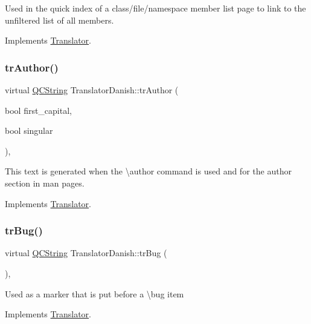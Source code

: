 Used in the quick index of a class/file/namespace member list page to link to the unfiltered list of all members. 

Implements \mbox{\hyperlink{class_translator}{Translator}}.

\mbox{\label{class_translator_danish_a0043467eabe0fc797268e9404c17d26b}} 
\subsubsection{\texorpdfstring{trAuthor()}{trAuthor()}}
{\footnotesize\ttfamily virtual \mbox{\hyperlink{class_q_c_string}{Q\+C\+String}} Translator\+Danish\+::tr\+Author (\begin{DoxyParamCaption}\item[{bool}]{first\+\_\+capital,  }\item[{bool}]{singular }\end{DoxyParamCaption})\hspace{0.3cm}{\ttfamily [inline]}, {\ttfamily [virtual]}}

This text is generated when the \textbackslash{}author command is used and for the author section in man pages. 

Implements \mbox{\hyperlink{class_translator}{Translator}}.

\mbox{\label{class_translator_danish_a1948478202433cf0684428c518b3b708}} 
\subsubsection{\texorpdfstring{trBug()}{trBug()}}
{\footnotesize\ttfamily virtual \mbox{\hyperlink{class_q_c_string}{Q\+C\+String}} Translator\+Danish\+::tr\+Bug (\begin{DoxyParamCaption}{ }\end{DoxyParamCaption})\hspace{0.3cm}{\ttfamily [inline]}, {\ttfamily [virtual]}}

Used as a marker that is put before a \textbackslash{}bug item 

Implements \mbox{\hyperlink{class_translator}{Translator}}.

\mbox{\label{class_translator_danish_acd3f0e5b114937f9317b744c0308dd0a}} 
